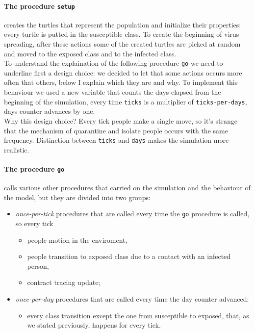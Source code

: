 \documentclass[12pt]{llncs}
\begin{document}
\paragraph{The procedure \texttt{setup}} creates the turtles that represent the population and initialize their properties: every turtle is putted in the susceptible class. To create the beginning of virus spreading, after these actions some of the created turtles are picked at random and moved to the exposed class and to the infected class.\\

To understand the explaination of the following procedure \texttt{go} we need to underline first a design choice: we decided to let that some actions occurs more often that others, below I explain which they are and why. To implement this behaviour we used a new variable that counts the days elapsed from the beginning of the simulation, every time \texttt{ticks} is a multiplier of \texttt{ticks-per-days}, days counter advances by one.\\
Why this design choice? Every tick people make a single move, so it's strange that the mechanism of quarantine and isolate people occurs with the same frequency. Distinction between \texttt{ticks} and \texttt{days} makes the simulation more realistic.

\paragraph{The procedure \texttt{go}} calls various other procedures that carried on the simulation and the behaviour of the model, but they are divided into two groups:
\begin{itemize}
\item \textit{once-per-tick} procedures that are called every time the \texttt{go} procedure is called, so every tick
\begin{itemize}
\item people motion in the enviroment, 
\item people transition to exposed class due to a contact with an infected person,
\item contract tracing update;
\end{itemize}
\item \textit{once-per-day} procedures that are called every time the day counter advanced:
\begin{itemize}
\item every class transition except the one from susceptible to exposed, that, as we stated previously, happens for every tick.
\end{itemize}
\end{itemize}
\end{document}
